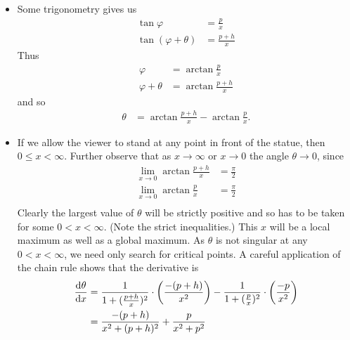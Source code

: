\begin{eg}
\begin{itemize}
\item Some trigonometry gives us
\begin{align*}
\tan \varphi &= \frac{p}{x} \\
\tan (\varphi+\theta) &= \frac{p+h}{x}
\end{align*}
Thus
\begin{align*}
  \varphi &= \arctan \frac{p}{x} \\
  \varphi+\theta &= \arctan \frac{p+h}{x}
\end{align*}
and so
\begin{align*}
  \theta &= \arctan \frac{p+h}{x} - \arctan\frac{p}{x}.
\end{align*}
\item If we allow the viewer to stand at any point in front of the statue, then $0\le x
<\infty$. Further observe that as $x \rightarrow \infty$ or $x \rightarrow 0$ the angle
$\theta \rightarrow 0$,  since
\begin{align*}
  \lim_{x\rightarrow 0} \arctan \frac{p+h}{x} &= \frac{\pi}{2} \\
  \lim_{x\rightarrow 0} \arctan \frac{p}{x} &= \frac{\pi}{2} \\
\end{align*}
Clearly the largest value of $\theta$ will be strictly positive and so has to be taken for
some $0<x<\infty$. (Note the strict inequalities.) This $x$ will be a local maximum as
well as a global maximum. As $\theta$ is not singular at any $0<x<\infty$, we need only
search for critical points.
A careful application of the chain rule shows that
the derivative is
\begin{align*}
  \diff{\theta}{x}
  &=
  \frac{1}{1+(\frac{p+h}{x})^2}\cdot \left(\frac{-(p+h)}{x^2}\right) -
  \frac{1}{1+(\frac{p}{x})^2}\cdot \left(\frac{-p}{x^2}\right)\\
  &= \frac{-(p+h)}{x^2+(p+h)^2} + \frac{p}{x^2+p^2}
\end{align*}

\end{itemize}
\end{eg}
